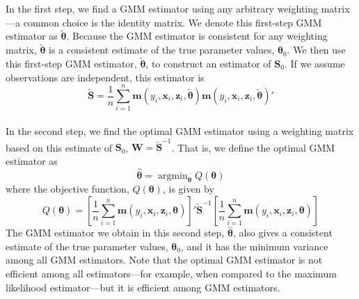 \documentclass[11pt,letterpaper]{article}
\DeclareMathOperator*{\argmin}{argmin}
\begin{document}
\noindent In the first step, we find a GMM estimator using any arbitrary weighting matrix---a common choice is the identity matrix. We denote this first-step GMM estimator as $\widetilde{\bm{\theta}}$. Because the GMM estimator is consistent for any weighting matrix, $\widetilde{\bm{\theta}}$ is a consistent estimate of the true parameter values, $\bm{\theta}_0$. We then use this first-step GMM estimator, $\widetilde{\bm{\theta}}$, to construct an estimator of $\bm{S}_0$. If we assume observations are independent, this estimator is
$$\widetilde{\bm{S}} = \frac{1}{n} \sum_{i = 1}^n \bm{m}(y_i, \bm{x}_i, \bm{z}_i, \widetilde{\bm{\theta}}) \bm{m}(y_i, \bm{x}_i, \bm{z}_i, \widetilde{\bm{\theta}})'$$ \\
In the second step, we find the optimal GMM estimator using a weighting matrix based on this estimate of $\bm{S}_0$, $\bm{W} = \widetilde{\bm{S}}^{-1}$. That is, we define the optimal GMM estimator as
$$\widehat{\bm{\theta}} = \argmin_{\bm{\theta}} Q(\bm{\theta})$$
where the objective function, $Q(\bm{\theta})$, is given by
$$Q(\bm{\theta}) = \left[ \frac{1}{n} \sum_{i = 1}^n \bm{m}(y_i, \bm{x}_i, \bm{z}_i, \bm{\theta}) \right]' \widetilde{\bm{S}}^{-1} \left[ \frac{1}{n} \sum_{i = 1}^n \bm{m}(y_i, \bm{x}_i, \bm{z}_i, \bm{\theta}) \right]$$
The GMM estimator we obtain in this second step, $\widehat{\bm{\theta}}$, also gives a consistent estimate of the true parameter values, $\bm{\theta}_0$, and it has the minimum variance among all GMM estimators. Note that the optimal GMM estimator is not efficient among all estimators---for example, when compared to the maximum likelihood estimator---but it is efficient among GMM estimators. \\
\end{document}
